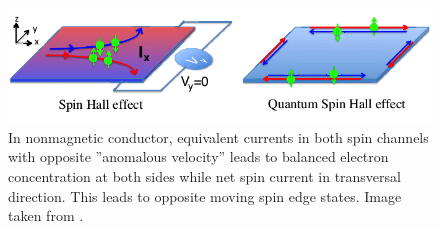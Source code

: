\begin{figure}[h]
        \centering
        \includegraphics[width=\textwidth]{Immagini/ValleyHall/spin-hall-temp.png}
        \caption{In nonmagnetic conductor, equivalent currents in both spin channels with opposite ”anomalous velocity” leads to balanced electron concentration at both sides while net spin current in transversal direction. This leads to opposite moving spin edge states. Image taken from \cite{weng2015anomalous}.}
        \label{fig:gaps-topo-haldane}
    \end{figure}


